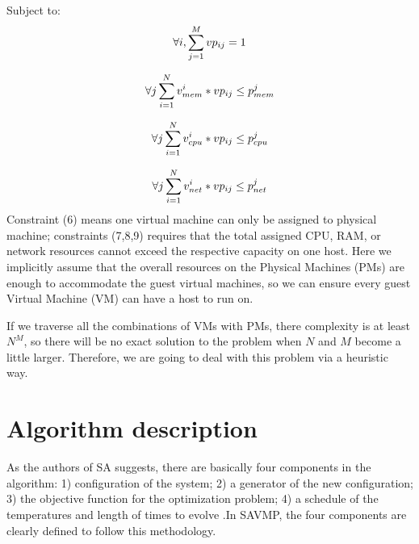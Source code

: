 \documentclass[10pt, conference, compsocconf]{IEEEtran}
\begin{document}
Subject to: \\
\begin{equation}\label{6}
\forall i,\sum_{j=1}^Mvp_{ij}=1  \\
\end{equation}

\begin{equation}\label{7}
\forall j \sum_{i=1}^Nv_{mem}^i*vp_{ij}\leq p_{mem}^j \\
\end{equation}

\begin{equation}\label{8}
\forall j \sum_{i=1}^Nv_{cpu}^i*vp_{ij}\leq p_{cpu}^j \\
\end{equation}

\begin{equation}\label{9}
\forall j \sum_{i=1}^Nv_{net}^i*vp_{ij}\leq p_{net}^j \\
\end{equation}
Constraint (6) means one virtual machine can only be assigned to physical
machine; constraints (7,8,9) requires that the total assigned CPU, RAM, or
network resources cannot exceed the respective capacity on one host. Here we
implicitly assume that the overall resources on the Physical Machines (PMs) are
enough to accommodate the guest virtual machines, so we can ensure every guest
Virtual Machine (VM) can have a host to run on.

If we traverse all the combinations of VMs with PMs, there complexity is at
least $N^M$, so there will be no exact solution to the problem when $N$ and $M$
become a little larger. Therefore, we are going to deal with this problem via a
heuristic way.


\section{Algorithm description}

As the authors of SA suggests, there are basically four components in the
algorithm: 1) configuration of the system; 2) a generator of the new
configuration; 3) the objective function for the optimization problem; 4) a
schedule of the temperatures and length of times to evolve
\cite{kirkpatrick83}.In SAVMP, the four components are clearly defined to follow this methodology.
\end{document}
